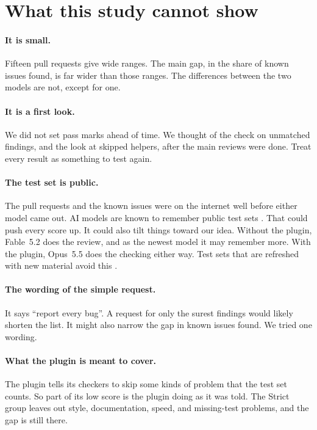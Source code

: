 \documentclass[11pt]{article}
\begin{document}
\section{What this study cannot show}
\label{sec:threats}

\paragraph{It is small.} Fifteen pull requests give wide ranges. The main gap, in the share of known issues found, is far wider than those ranges. The differences between the two models are not, except for one.

\paragraph{It is a first look.} We did not set pass marks ahead of time. We thought of the check on unmatched findings, and the look at skipped helpers, after the main reviews were done. Treat every result as something to test again.

\paragraph{The test set is public.} The pull requests and the known issues were on the internet well before either model came out. AI models are known to remember public test sets \citep{ramos2024memorizing,liang2025illusion}. That could push every score up. It could also tilt things toward our idea. Without the plugin, Fable~5.2 does the review, and as the newest model it may remember more. With the plugin, Opus~5.5 does the checking either way. Test sets that are refreshed with new material avoid this \citep{badertdinov2025rebench}.

\paragraph{The wording of the simple request.} It says ``report every bug''. A request for only the surest findings would likely shorten the list. It might also narrow the gap in known issues found. We tried one wording.

\paragraph{What the plugin is meant to cover.} The plugin tells its checkers to skip some kinds of problem that the test set counts. So part of its low score is the plugin doing as it was told. The Strict group leaves out style, documentation, speed, and missing-test problems, and the gap is still there.
\end{document}
